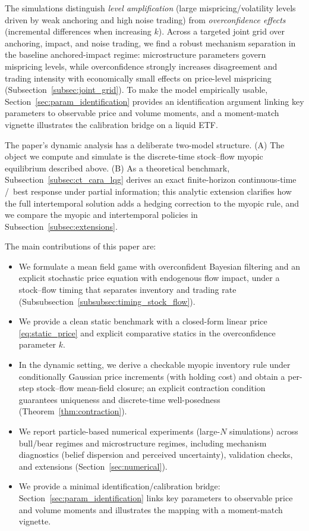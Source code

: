 The simulations distinguish \emph{level amplification} (large mispricing/volatility levels driven by weak anchoring and high noise trading) from \emph{overconfidence effects} (incremental differences when increasing $k$). Across a targeted joint grid over anchoring, impact, and noise trading, we find a robust mechanism separation in the baseline anchored-impact regime: microstructure parameters govern mispricing levels, while overconfidence strongly increases disagreement and trading intensity with economically small effects on price-level mispricing (Subsection~\ref{subsec:joint_grid}). To make the model empirically usable, Section~\ref{sec:param_identification} provides an identification argument linking key parameters to observable price and volume moments, and a moment-match vignette illustrates the calibration bridge on a liquid ETF.

The paper's dynamic analysis has a deliberate two-model structure. (A) The object we compute and simulate is the discrete-time stock--flow myopic equilibrium described above. (B) As a theoretical benchmark, Subsection~\ref{subsec:ct_cara_lqg} derives an exact finite-horizon continuous-time \CARA/\LQG\ best response under partial information; this analytic extension clarifies how the full intertemporal solution adds a hedging correction to the myopic rule, and we compare the myopic and intertemporal policies in Subsection~\ref{subsec:extensions}.

The main contributions of this paper are:
\begin{itemize}
    \item We formulate a mean field game with overconfident Bayesian filtering and an explicit stochastic price equation with endogenous flow impact, under a stock--flow timing that separates inventory and trading rate (Subsubsection~\ref{subsubsec:timing_stock_flow}).
    \item We provide a clean static benchmark with a closed-form linear price \eqref{eq:static_price} and explicit comparative statics in the overconfidence parameter $k$.
    \item In the dynamic setting, we derive a checkable myopic \CARA inventory rule under conditionally Gaussian price increments (with holding cost) and obtain a per-step stock--flow mean-field closure; an explicit contraction condition guarantees uniqueness and discrete-time well-posedness (Theorem~\ref{thm:contraction}).
    \item We report particle-based numerical experiments (large-$N$ simulations) across bull/bear regimes and microstructure regimes, including mechanism diagnostics (belief dispersion and perceived uncertainty), validation checks, and extensions (Section~\ref{sec:numerical}).
    \item We provide a minimal identification/calibration bridge: Section~\ref{sec:param_identification} links key parameters to observable price and volume moments and illustrates the mapping with a moment-match vignette.
\end{itemize}

